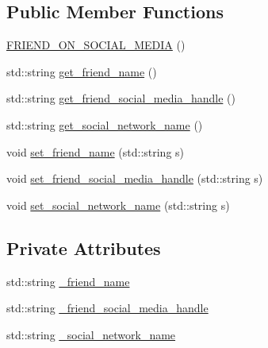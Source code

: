 \subsection*{Public Member Functions}
\begin{DoxyCompactItemize}
\item 
\hyperlink{classAsteroids_1_1TechnicalServices_1_1Social_1_1FRIEND__ON__SOCIAL__MEDIA_aafc3808f9cf218d421af02c65dc7eeff}{F\+R\+I\+E\+N\+D\+\_\+\+O\+N\+\_\+\+S\+O\+C\+I\+A\+L\+\_\+\+M\+E\+D\+IA} ()
\item 
std\+::string \hyperlink{classAsteroids_1_1TechnicalServices_1_1Social_1_1FRIEND__ON__SOCIAL__MEDIA_a35ff2ca681821ecbd9f5c6a0f70ca9cb}{get\+\_\+friend\+\_\+name} ()
\item 
std\+::string \hyperlink{classAsteroids_1_1TechnicalServices_1_1Social_1_1FRIEND__ON__SOCIAL__MEDIA_aa1f0050545b472eb67776676e5898d6f}{get\+\_\+friend\+\_\+social\+\_\+media\+\_\+handle} ()
\item 
std\+::string \hyperlink{classAsteroids_1_1TechnicalServices_1_1Social_1_1FRIEND__ON__SOCIAL__MEDIA_a3a86e03a72a74702818bb8b0c1f453d6}{get\+\_\+social\+\_\+network\+\_\+name} ()
\item 
void \hyperlink{classAsteroids_1_1TechnicalServices_1_1Social_1_1FRIEND__ON__SOCIAL__MEDIA_a1902b65f552f6b7c32315278d0de3d94}{set\+\_\+friend\+\_\+name} (std\+::string s)
\item 
void \hyperlink{classAsteroids_1_1TechnicalServices_1_1Social_1_1FRIEND__ON__SOCIAL__MEDIA_ae9c96c580b9d02e248f5695fc0b79f46}{set\+\_\+friend\+\_\+social\+\_\+media\+\_\+handle} (std\+::string s)
\item 
void \hyperlink{classAsteroids_1_1TechnicalServices_1_1Social_1_1FRIEND__ON__SOCIAL__MEDIA_a181c64aa194c3a48f5d00c117139c7ef}{set\+\_\+social\+\_\+network\+\_\+name} (std\+::string s)
\end{DoxyCompactItemize}
\subsection*{Private Attributes}
\begin{DoxyCompactItemize}
\item 
std\+::string \hyperlink{classAsteroids_1_1TechnicalServices_1_1Social_1_1FRIEND__ON__SOCIAL__MEDIA_a0338c1e529f0621a06b48b68626a1f87}{\+\_\+friend\+\_\+name}
\item 
std\+::string \hyperlink{classAsteroids_1_1TechnicalServices_1_1Social_1_1FRIEND__ON__SOCIAL__MEDIA_a8637f0d73c4bb57f2b9f83b1ba2f8e10}{\+\_\+friend\+\_\+social\+\_\+media\+\_\+handle}
\item 
std\+::string \hyperlink{classAsteroids_1_1TechnicalServices_1_1Social_1_1FRIEND__ON__SOCIAL__MEDIA_a48e57e256586bcf1bf66f923842ff964}{\+\_\+social\+\_\+network\+\_\+name}
\end{DoxyCompactItemize}


